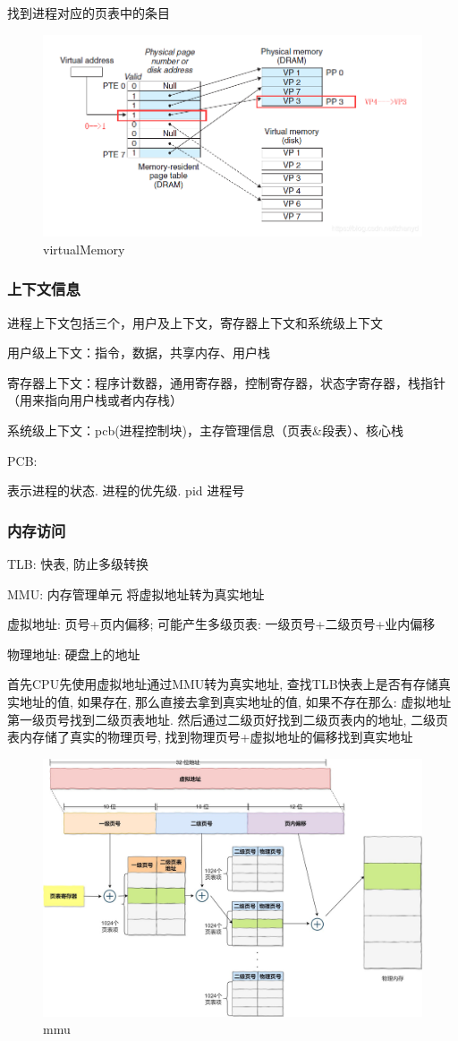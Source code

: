 \documentclass[UTF8]{ctexart}
\begin{document}
找到进程对应的页表中的条目

\begin{figure}
	\centering
	\includegraphics[width=0.7\linewidth]{figures/virtualMemory.png}
	\caption{virtualMemory}
	\label{fig:virtualMemory}
\end{figure}


\subsubsection{上下文信息}
进程上下文包括三个，用户及上下文，寄存器上下文和系统级上下文

用户级上下文：指令，数据，共享内存、用户栈

寄存器上下文：程序计数器，通用寄存器，控制寄存器，状态字寄存器，栈指针（用来指向用户栈或者内存栈）

系统级上下文：pcb(进程控制块)，主存管理信息（页表\&段表）、核心栈

PCB:

表示进程的状态. 进程的优先级. pid 进程号

\subsubsection{内存访问}
TLB: 快表, 防止多级转换

MMU: 内存管理单元 将虚拟地址转为真实地址

虚拟地址: 页号+页内偏移; 可能产生多级页表: 一级页号+二级页号+业内偏移



物理地址: 硬盘上的地址


首先CPU先使用虚拟地址通过MMU转为真实地址, 查找TLB快表上是否有存储真实地址的值, 如果存在, 那么直接去拿到真实地址的值, 如果不存在那么: 虚拟地址第一级页号找到二级页表地址. 然后通过二级页好找到二级页表内的地址, 二级页表内存储了真实的物理页号, 找到物理页号+虚拟地址的偏移找到真实地址

\begin{figure}
	\centering
	\includegraphics[width=0.7\linewidth]{figures/mmu.jpg}
	\caption{mmu}
	\label{fig:mmu}
\end{figure}
\end{document}
